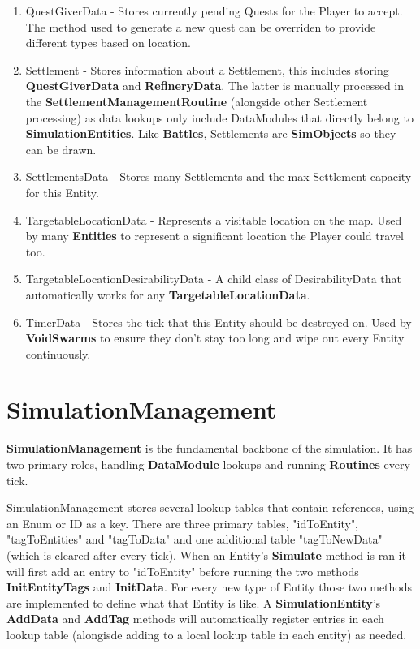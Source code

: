 \documentclass{report}
\begin{document}
\begin{enumerate}
	\item QuestGiverData - Stores currently pending Quests for the Player to accept. The method used to generate a new quest can be overriden to provide different types based on location.
	\item Settlement - Stores information about a Settlement, this includes storing \textbf{QuestGiverData} and \textbf{RefineryData}. The latter is manually processed in the \textbf{SettlementManagementRoutine} (alongside other Settlement processing) as data lookups only include DataModules that directly belong to \textbf{SimulationEntities}. Like \textbf{Battles}, Settlements are \textbf{SimObjects} so they can be drawn. 

	\item SettlementsData - Stores many Settlements and the max Settlement capacity for this Entity.
	\item TargetableLocationData - Represents a visitable location on the map. Used by many \textbf{Entities} to represent a significant location the Player could travel too.
	\item TargetableLocationDesirabilityData - A child class of DesirabilityData that automatically works for any \textbf{TargetableLocationData}.
	\item TimerData - Stores the tick that this Entity should be destroyed on. Used by \textbf{VoidSwarms} to ensure they don't stay too long and wipe out every Entity continuously.

\end{enumerate}

\section{SimulationManagement}

\textbf{SimulationManagement} is the fundamental backbone of the simulation. It has two primary roles, handling \textbf{DataModule} lookups and running \textbf{Routines} every tick.

SimulationManagement stores several lookup tables that contain references, using an Enum or ID as a key. There are three primary tables, "idToEntity", "tagToEntities" and "tagToData" and one additional table "tagToNewData" (which is cleared after every tick). When an Entity's \textbf{Simulate} method is ran it will first add an entry to "idToEntity" before running the two methods \textbf{InitEntityTags} and \textbf{InitData}. For every new type of Entity those two methods are implemented to define what that Entity is like.
A \textbf{SimulationEntity}'s \textbf{AddData} and \textbf{AddTag} methods will automatically register entries in each lookup table (alongisde adding to a local lookup table in each entity) as needed.
\end{document}

